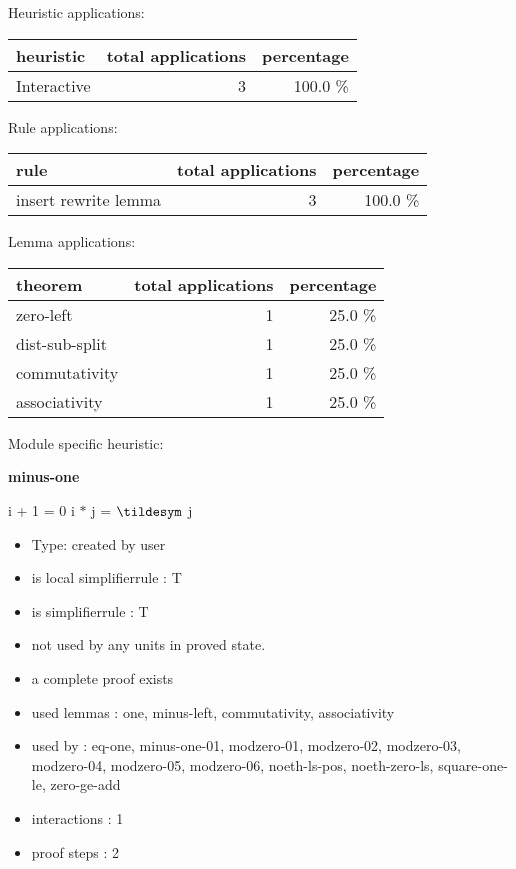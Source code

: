\documentclass[a4paper]{article}
\begin{document}
\medskip


Heuristic applications:

\begin{supertabular}{l|r|r}
heuristic	& total applications & percentage \\ \hline
Interactive & 3 & 100.0 \% \\

\end{supertabular}

Rule applications:

\begin{supertabular}{l|r|r}
rule	        & total applications & percentage \\ \hline
insert rewrite lemma & 3 & 100.0 \% \\

\end{supertabular}

Lemma applications:

\begin{supertabular}{l|r|r}
theorem	        & total applications & percentage \\ \hline
zero-left & 1 & 25.0 \% \\
dist-sub-split & 1 & 25.0 \% \\
commutativity & 1 & 25.0 \% \\
associativity & 1 & 25.0 \% \\

\end{supertabular}

Module specific heuristic:

\pagebreak

{\LARGE\bf minus-one}\label{lemma-minus-one}

\medskip

 \Fol i + 1 = 0 \Imp i $*$ j = $\tildesym$ j

\begin{itemize}

\item Type: created by user

\item is local simplifierrule : T
\item is simplifierrule : T
\item not used by any units in proved state.
\item       a complete proof exists
\item       used lemmas  : one, minus-left, commutativity, associativity
\item       used by      : eq-one, minus-one-01, modzero-01, modzero-02, modzero-03, modzero-04, modzero-05, modzero-06, noeth-ls-pos, noeth-zero-ls, square-one-le, zero-ge-add
\item       interactions : 1
\item       proof steps  : 2
\end{itemize}
\end{document}

